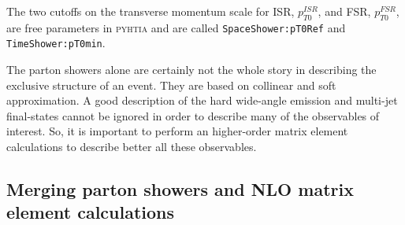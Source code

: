 
\noindent The two cutoffs on the transverse momentum scale for ISR, $p_{T0}^{ISR}$, and FSR, $p_{T0}^{FSR}$,  are free parameters in \textsc{pyhtia} and are called \texttt{Space}\-\texttt{Shower:}\-\texttt{pT0}\-\texttt{Ref}   and \texttt{Time}\-\texttt{Shower:}\-\texttt{pT0}\-\texttt{min}.

\medskip

The parton showers alone are certainly not the whole story in describing the exclusive structure of an event. They are based on collinear and soft approximation. A good description of the hard wide-angle emission and multi-jet final-states cannot be ignored in order to describe many of the observables of interest. So, it is important to perform an higher-order matrix element calculations to describe better all these observables.  


\subsection{Merging parton showers and NLO matrix element calculations}
\label{sec:merging}

